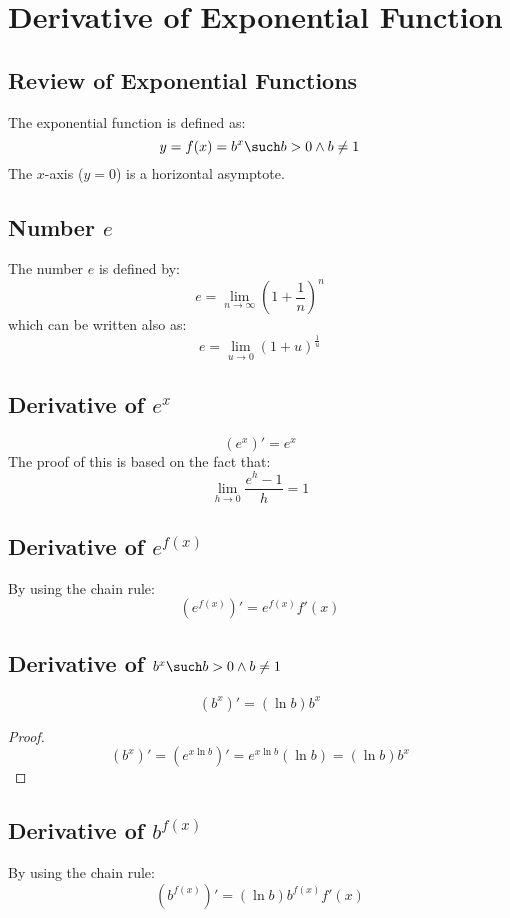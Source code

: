 \section{Derivative of Exponential Function}
\subsection{Review of Exponential Functions}
	The exponential function is defined as:
	\[y = f(x) = b^x \such b > 0 \land b \neq 1\]
	The $x$-axis ($y=0$) is a horizontal asymptote.
\subsection{Number $e$}
	The number $e$ is defined by:
	\[e = \lim_{n \to \infty}\left( 1 + \frac{1}{n} \right)^n\]
	which can be written also as:
	\[e = \lim_{u \to 0}(1 + u)^{\frac{1}{u}}\]
\subsection{Derivative of $e^x$}
	\[\left( e^x \right)' = e^x\]
	The proof of this is based on the fact that:
	\[\lim_{h \to 0} \frac{e^h - 1}{h} = 1\]
\subsection{Derivative of $e^{f(x)}$}
	By using the chain rule:
	\[\left( e^{f(x)} \right)' = e^{f(x)} f'(x)\]
\subsection{Derivative of $b^x \such b > 0 \land b \neq 1$}
	\[\left( b^x \right)' = (\ln b) b^x\]
	\begin{proof}
		\[\left( b^x \right)' = \left( e^{x \ln b} \right)' = e^{x \ln b}(\ln b) = (\ln b) b^x\]
	\end{proof}
\subsection{Derivative of $b^{f(x)}$}
	By using the chain rule:
	\[\left( b^{f(x)} \right)' = (\ln b)b^{f(x)} f'(x)\]
